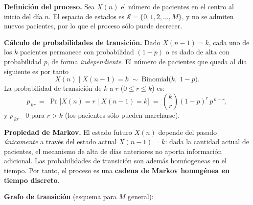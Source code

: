 \documentclass[10pt,a4paper]{article}
\newcommand{\pij}[2]{p_{\,#1#2}}
\begin{document}
\textbf{Definici\'on del proceso.}\quad
Sea $X(n)$ el n\'umero de pacientes en el centro al inicio del d\'ia $n$. El espacio
de estados es $\mathcal{S} = \{0, 1, 2, \ldots, M\}$, y no se admiten nuevos
pacientes, por lo que el proceso s\'olo puede decrecer.

\medskip
\textbf{C\'alculo de probabilidades de transici\'on.}\quad
Dado $X(n-1)=k$, cada uno de los $k$ pacientes permanece con probabilidad $(1-p)$
o es dado de alta con probabilidad $p$, de forma \emph{independiente}. El n\'umero
de pacientes que queda al d\'ia siguiente es por tanto
\[
  X(n)\;\big|\;X(n-1)=k \;\sim\; \mathrm{Binomial}\!\bigl(k,\;1-p\bigr).
\]
La probabilidad de transici\'on de $k$ a $r$ ($0\le r\le k$) es:
\[
  \pij{kr} \;=\; \Pr\!\bigl[X(n)=r\mid X(n-1)=k\bigr]
  \;=\; \binom{k}{r}(1-p)^{r}\,p^{\,k-r},
\]
y $\pij{kr}=0$ para $r>k$ (los pacientes s\'olo pueden marcharse).

\medskip
\textbf{Propiedad de Markov.}\quad
El estado futuro $X(n)$ depende del pasado \emph{\'unicamente} a trav\'es del estado
actual $X(n-1)=k$: dada la cantidad actual de pacientes, el mecanismo de alta de
d\'ias anteriores no aporta informaci\'on adicional. Las probabilidades de
transici\'on son adem\'as hom\'nogeneas en el tiempo. Por tanto, el proceso es una
\textbf{cadena de Markov homog\'enea en tiempo discreto}.

\medskip
\textbf{Grafo de transici\'on} (esquema para $M$ general):
\end{document}
